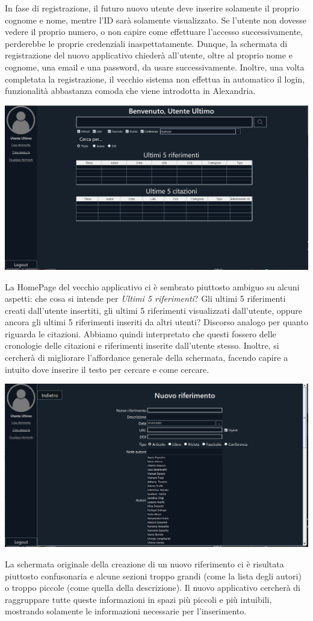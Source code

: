 In fase di registrazione, il futuro nuovo utente deve inserire solamente il proprio cognome e nome, mentre l'ID sarà solamente visualizzato. Se l'utente non dovesse vedere il proprio numero, o non capire come effettuare l'accesso successivamente, perderebbe le proprie credenziali inaspettatamente. Dunque, la schermata di registrazione del nuovo applicativo chiederà all'utente, oltre al proprio nome e cognome, una email e una password, da usare successivamente. Inoltre, una volta completata la registrazione, il vecchio sistema non effettua in automatico il login, funzionalità abbastanza comoda che viene introdotta in Alexandria.

         \begin{center}
            \includegraphics[width=.80\textwidth]{Immagini/VecchioProgetto/homepage.jpg} 
        \end{center}
La HomePage del vecchio applicativo ci è sembrato piuttosto ambiguo su alcuni aspetti: che cosa si intende per \textit{Ultimi 5 riferimenti}? Gli ultimi 5 riferimenti creati dall'utente insertiti, gli ultimi 5 riferimenti visualizzati dall'utente, oppure ancora gli ultimi 5 riferimenti inseriti da altri utenti? Discorso analogo per quanto riguarda le citazioni. Abbiamo quindi interpretato che questi fossero delle cronologie delle citazioni e riferimenti inserite dall'utente stesso. Inoltre, si cercherà di migliorare l'affordance generale della schermata, facendo capire a intuito dove inserire il testo per cercare e come cercare.

         \begin{center}
            \includegraphics[width=.80\textwidth]{Immagini/VecchioProgetto/crea riferimento.jpg} 
        \end{center}
La schermata originale della creazione di un nuovo riferimento ci è risultata piuttosto confusonaria e alcune sezioni troppo grandi (come la lista degli autori) o troppo piccole (come quella della descrizione). Il nuovo applicativo cercherà di raggruppare tutte queste informazioni in spazi più piccoli e più intuibili, mostrando solamente le informazioni necessarie per l'inserimento.

